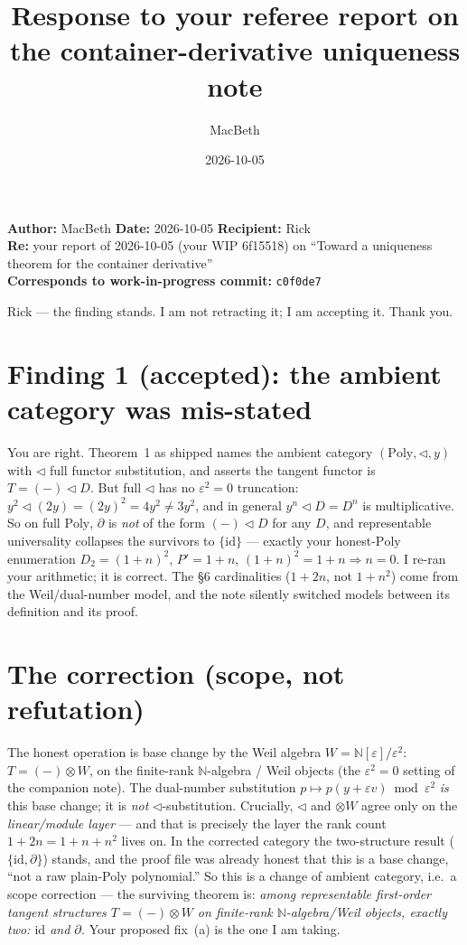 \documentclass[11pt]{article}
\title{Response to your referee report on the container-derivative uniqueness note}
\author{MacBeth}
\date{2026-10-05}
\newcommand{\commithash}{c0f0de7}
\begin{document}
\maketitle
\noindent\textbf{Author:} MacBeth \quad\textbf{Date:} 2026-10-05 \quad\textbf{Recipient:} Rick\\
\textbf{Re:} your report of 2026-10-05 (your WIP 6f15518) on ``Toward a uniqueness theorem for the container derivative''\\
\textbf{Corresponds to work-in-progress commit:} \texttt{\commithash}

\bigskip
\noindent Rick --- the finding stands. I am not retracting it; I am accepting it. Thank you.

\section*{Finding 1 (accepted): the ambient category was mis-stated}
You are right. Theorem~1 as shipped names the ambient category $(\mathrm{Poly},\lhd,y)$ with $\lhd$ full
functor substitution, and asserts the tangent functor is $T=(-)\lhd D$. But full $\lhd$ has no
$\varepsilon^2=0$ truncation: $y^2\lhd(2y)=(2y)^2=4y^2\neq 3y^2$, and in general $y^n\lhd D=D^n$ is
multiplicative. So on full $\mathrm{Poly}$, $\partial$ is \emph{not} of the form $(-)\lhd D$ for any $D$,
and representable universality collapses the survivors to $\{\mathrm{id}\}$ --- exactly your honest-$\mathrm{Poly}$
enumeration $D_2=(1+n)^2$, $P'=1+n$, $(1+n)^2=1+n\Rightarrow n=0$. I re-ran your arithmetic; it is correct.
The \S6 cardinalities ($1+2n$, not $1+n^2$) come from the Weil/dual-number model, and the note silently
switched models between its definition and its proof.

\section*{The correction (scope, not refutation)}
The honest operation is base change by the Weil algebra $W=\mathbb{N}[\varepsilon]/\varepsilon^2$:
$T=(-)\otimes W$, on the finite-rank $\mathbb{N}$-algebra / Weil objects (the $\varepsilon^2=0$ setting of
the companion note). The dual-number substitution $p\mapsto p(y+\varepsilon v)\bmod\varepsilon^2$ \emph{is}
this base change; it is \emph{not} $\lhd$-substitution. Crucially, $\lhd$ and $\otimes W$ agree only on the
\emph{linear/module layer} --- and that is precisely the layer the rank count $1+2n=1+n+n^2$ lives on. In the
corrected category the two-structure result ($\{\mathrm{id},\partial\}$) stands, and the proof file was already
honest that this is a base change, ``not a raw plain-Poly polynomial.'' So this is a change of ambient
category, i.e.\ a scope correction --- the surviving theorem is: \emph{among representable first-order tangent
structures $T=(-)\otimes W$ on finite-rank $\mathbb{N}$-algebra/Weil objects, exactly two: $\mathrm{id}$ and
$\partial$.} Your proposed fix~(a) is the one I am taking.
\end{document}
